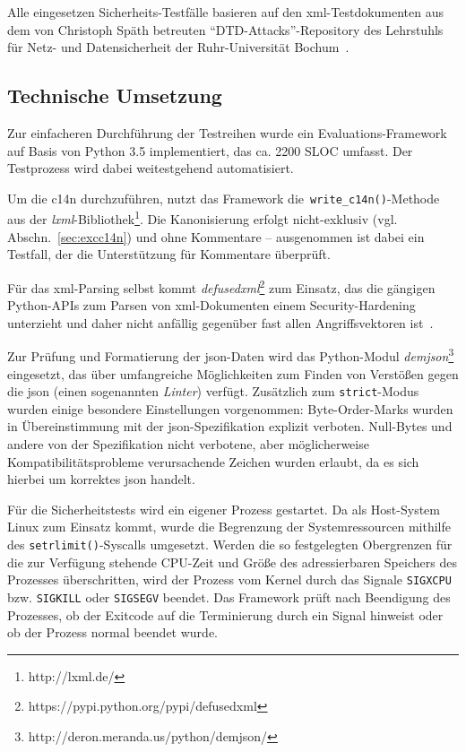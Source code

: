 Alle eingesetzen Sicherheits-Testfälle basieren auf den \acrshort{xml}-Testdokumenten aus dem von Christoph Späth betreuten \enquote{DTD-Attacks}-Repository des Lehrstuhls für Netz- und Datensicherheit der Ruhr-Universität Bochum~\cite{dtdattacksrepo}.

\subsection{Technische Umsetzung}


Zur einfacheren Durchführung der Testreihen wurde ein Evaluations-Framework auf Basis von Python 3.5 implementiert, das ca. 2200 SLOC umfasst. Der Testprozess wird dabei weitestgehend automatisiert.

Um die \acrlong{c14n} durchzuführen, nutzt das Framework die~\texttt{write_c14n()}-Methode aus der \emph{lxml}-Bibliothek\footnote{http://lxml.de/}. Die Kanonisierung erfolgt nicht-exklusiv (vgl. Abschn.~\ref{sec:excc14n}) und ohne Kommentare -- ausgenommen ist dabei ein Testfall, der die Unterstützung für Kommentare überprüft.

Für das \acrshort{xml}-Parsing selbst kommt \emph{defusedxml}\footnote{https://pypi.python.org/pypi/defusedxml} zum Einsatz, das die gängigen Python-APIs zum Parsen von \acrshort{xml}-Dokumenten einem Security-Hardening unterzieht und daher nicht anfällig gegenüber fast allen Angriffsvektoren ist~\cite[Abschn. 9.5]{spaeth2016sok}.

Zur Prüfung und Formatierung der \acrshort{json}-Daten wird das Python-Modul \emph{demjson}\footnote{http://deron.meranda.us/python/demjson/} eingesetzt, das über umfangreiche Möglichkeiten zum Finden von Verstößen gegen die \acrshort{json} (einen sogenannten \emph{Linter}) verfügt. Zusätzlich zum \texttt{strict}-Modus wurden einige besondere Einstellungen vorgenommen: Byte-Order-Marks wurden in Übereinstimmung mit der \acrshort{json}-Spezifikation explizit verboten. Null-Bytes und andere von der Spezifikation nicht verbotene, aber möglicherweise Kompatibilitätsprobleme verursachende Zeichen wurden erlaubt, da es sich hierbei um korrektes \acrshort{json} handelt.

Für die Sicherheitstests wird ein eigener Prozess gestartet. Da als Host-System Linux zum Einsatz kommt, wurde die Begrenzung der Systemressourcen mithilfe des \texttt{setrlimit()}-Syscalls umgesetzt. Werden die so festgelegten Obergrenzen für die zur Verfügung stehende CPU-Zeit und Größe des adressierbaren Speichers des Prozesses überschritten, wird der Prozess vom Kernel durch das Signale \texttt{SIGXCPU} bzw. \texttt{SIGKILL} oder \texttt{SIGSEGV} beendet. Das Framework prüft nach Beendigung des Prozesses, ob der Exitcode auf die Terminierung durch ein Signal hinweist oder ob der Prozess normal beendet wurde.
